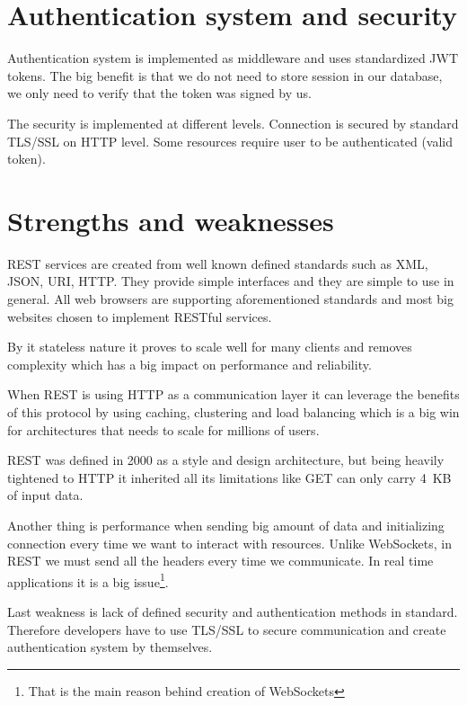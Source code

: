 \section{Authentication system and security}
Authentication system is implemented as middleware and uses standardized JWT tokens\cite{JWT-rfc}. The big benefit is that we do not need to store session in our database, we only need to verify that the token was signed by us.

The security is implemented at different levels. Connection is secured by standard TLS/SSL on HTTP level. Some resources require user to be authenticated (valid token).


\section{Strengths and weaknesses}
REST services are created from well known defined standards such as XML, JSON, URI, HTTP\@. They provide simple interfaces and they are simple to use in general. All web browsers are supporting aforementioned standards and most big websites chosen to implement RESTful services.

By it stateless nature it proves to scale well for many clients and removes complexity which has a big impact on performance and reliability.

When REST is using HTTP as a communication layer it can leverage the benefits of this protocol by using caching, clustering and load balancing which is a big win for architectures that needs to scale for millions of users.

REST was defined in 2000\cite{REST-wiki} as a style and design architecture, but being heavily tightened to HTTP it inherited all its limitations like GET can only carry 4~KB of input data\cite[p.~3]{restful-web-services}.

Another thing is performance when sending big amount of data and initializing connection every time we want to interact with resources. Unlike WebSockets, in REST we must send all the headers every time we communicate. In real time applications it is a big issue\footnote{That is the main reason behind creation of WebSockets}.

Last weakness is lack of defined security and authentication methods in standard. Therefore developers have to use TLS/SSL to secure communication and create authentication system by themselves.
